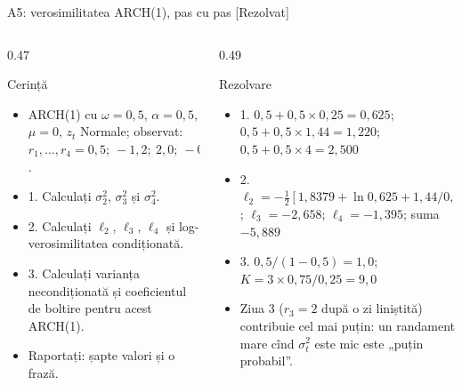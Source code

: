 \begin{frame}{A5: verosimilitatea ARCH(1), pas cu pas [Rezolvat]}
\itemsize{\scriptsize}
\begin{columns}[T]
\begin{column}{0.47\textwidth}
\begin{block}{Cerință}
\begin{itemize}
    \item ARCH(1) cu $\omega = 0{,}5$, $\alpha = 0{,}5$, $\mu = 0$, $z_t$ Normale; observat: $r_1, \dots, r_4 = 0{,}5;\ -1{,}2;\ 2{,}0;\ -0{,}3$.
    \item 1. Calculați $\sigma_2^2$, $\sigma_3^2$ și $\sigma_4^2$.
    \item 2. Calculați $\ell_2$, $\ell_3$, $\ell_4$ și log-verosimilitatea condiționată.
    \item 3. Calculați varianța necondiționată și coeficientul de boltire pentru acest ARCH(1).
    \item Raportați: șapte valori și o frază.
\end{itemize}
\end{block}
\end{column}
\begin{column}{0.49\textwidth}
\begin{exampleblock}{Rezolvare}
\begin{itemize}
    \item 1. $0{,}5 + 0{,}5 \times 0{,}25 = 0{,}625$; $0{,}5 + 0{,}5 \times 1{,}44 = 1{,}220$; $0{,}5 + 0{,}5 \times 4 = 2{,}500$
    \item 2. $\ell_2 = -\frac12[1{,}8379 + \ln 0{,}625 + 1{,}44/0{,}625] = -1{,}836$; $\ell_3 = -2{,}658$; $\ell_4 = -1{,}395$; suma $-5{,}889$
    \item 3. $0{,}5/(1 - 0{,}5) = 1{,}0$; $K = 3 \times 0{,}75/0{,}25 = 9{,}0$
    \item Ziua 3 ($r_3 = 2$ după o zi liniștită) contribuie cel mai puțin: un randament mare cînd $\sigma_t^2$ este mic este „puțin probabil”.
\end{itemize}
\end{exampleblock}
\end{column}
\end{columns}
\end{frame}


